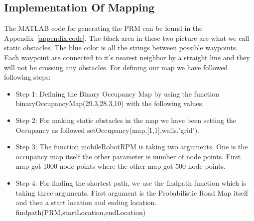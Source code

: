 \documentclass{article}
\begin{document}
	\subsection{Implementation Of Mapping}
	The MATLAB code for generating the PRM can be found in the Appendix~\ref{appendix:code}. The black area in these two picture are what we call static obstacles. The blue color is all the strings between possible waypoints. Each waypoint are connected to it's nearest neighbor by a straight line and they will not be crossing any obstacles. For defining our map we have followed following steps: 
	\begin{itemize}
		\item Step 1: Defining the Binary Occupancy Map by using the function binaryOccupancyMap(29.3,28.3,10) with the following values.
		\item Step 2: For making static obstacles in the map we have been setting the Occupancy as followed setOccupancy(map,[1,1],walls,'grid'). 
		\item Step 3: The function mobileRobotRPM is taking two arguments. One is the occupancy map itself the other parameter is number of node points. First map got 1000 node points where the other map got 500 node points.
		\item Step 4: For finding the shortest path, we use the findpath function which is taking three arguments. First argument is the Probabilistic Road Map itself and then a start location and ending location.  findpath(PRM,startLocation,endLocation)
	\end{itemize}
	
\end{document}
